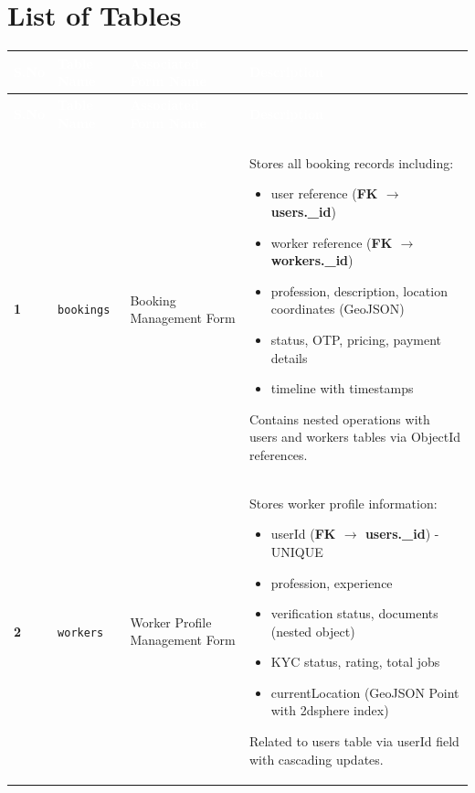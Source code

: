 \documentclass[12pt,a4paper]{article}
\begin{document}
\newpage
\section*{List of Tables}

\begin{longtable}{|>{\centering\arraybackslash}p{1cm}|p{3.5cm}|p{4.5cm}|p{6cm}|}
\hline
\rowcolor{headerblue}
\textcolor{white}{\textbf{S.No}} & \textcolor{white}{\textbf{Table Name}} & \textcolor{white}{\textbf{Associated Form Name}} & \textcolor{white}{\textbf{Description}} \\
\hline
\endfirsthead

\hline
\rowcolor{headerblue}
\textcolor{white}{\textbf{S.No}} & \textcolor{white}{\textbf{Table Name}} & \textcolor{white}{\textbf{Associated Form Name}} & \textcolor{white}{\textbf{Description}} \\
\hline
\endhead

\hline
\multicolumn{4}{r}{\textit{Continued on next page...}} \\
\endfoot

\hline
\endlastfoot

\rowcolor{lightgray}
\textbf{1} & \texttt{bookings} & Booking Management Form & Stores all booking records including:
\begin{itemize}
\item user reference (\textbf{FK $\rightarrow$ users.\_id})
\item worker reference (\textbf{FK $\rightarrow$ workers.\_id})
\item profession, description, location coordinates (GeoJSON)
\item status, OTP, pricing, payment details
\item timeline with timestamps
\end{itemize}
Contains nested operations with users and workers tables via ObjectId references. \\
\hline

\textbf{2} & \texttt{workers} & Worker Profile Management Form & Stores worker profile information:
\begin{itemize}
\item userId (\textbf{FK $\rightarrow$ users.\_id}) - UNIQUE
\item profession, experience
\item verification status, documents (nested object)
\item KYC status, rating, total jobs
\item currentLocation (GeoJSON Point with 2dsphere index)
\end{itemize}
Related to users table via userId field with cascading updates. \\
\hline


\end{longtable}
\end{document}
